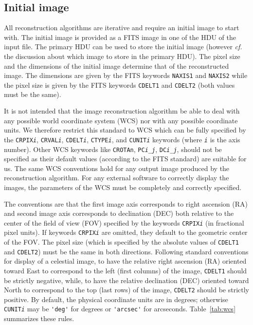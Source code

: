 \documentclass{article}
\newcommand{\KEYWORD}[1]{\texttt{#1}} %
\newcommand{\VARIABLE}[1]{\texttt{\textsl{#1}}}
\begin{document}
\subsection{Initial image}

All reconstruction algorithms are iterative and require an initial
image to start with. The initial image is provided as a FITS image in
one of the HDU of the input file. The primary HDU can be used to store
the initial image (however \emph{cf.} the discussion about which image
to store in the primary HDU). The pixel size and the dimensions of the
initial image determine that of the reconstructed image.  The
dimensions are given by the FITS keywords \KEYWORD{NAXIS1} and
\KEYWORD{NAXIS2} while the pixel size is given by the FITS keywords
\KEYWORD{CDELT1} and \KEYWORD{CDELT2} (both values must be the same).

It is not intended that the image reconstruction algorithm be able to deal
with any possible world coordinate system (WCS) nor with any possible
coordinate units.  We therefore restrict this standard to WCS which can be
fully specified by the \KEYWORD{CRPIX\VARIABLE{i}},
\KEYWORD{CRVAL\VARIABLE{i}}, \KEYWORD{CDELT\VARIABLE{i}},
\KEYWORD{CTYPE\VARIABLE{i}}, and \KEYWORD{CUNIT\VARIABLE{i}} keywords
(where \VARIABLE{i} is the axis number). Other WCS keywords like
\KEYWORD{CROTAn}, \KEYWORD{PC\VARIABLE{i}\_\VARIABLE{j}},
\KEYWORD{DC\VARIABLE{i}\_\VARIABLE{j}}, should not be specified as their
default values (according to the FITS standard) are suitable for us.  The
same WCS conventions hold for any output image produced by the
reconstruction algorithm.  For any external software to correctly display
the images, the parameters of the WCS must be completely and correctly
specified.

The conventions are that the first image axis corresponds to right
ascension (RA) and second image axis corresponds to declination (DEC) both
relative to the center of the field of view (FOV) specified by the keywords
\KEYWORD{CRPIX\VARIABLE{i}} (in fractional pixel units). If keywords
\KEYWORD{CRPIX\VARIABLE{i}} are omitted, they default to the geometric
center of the FOV. The pixel size (which is specified by the absolute
values of \KEYWORD{CDELT1} and \KEYWORD{CDELT2}) must be the same in both
directions.  Following standard conventions for display of a celestial
image, to have the relative right ascension (RA) oriented toward East to
correspond to the left (first columns) of the image, \KEYWORD{CDELT1}
should be strictly negative, while, to have the relative declination (DEC)
oriented toward North to correspond to the top (last rows) of the image,
\KEYWORD{CDELT2} should be strictly positive. By default, the physical
coordinate units are in degrees; otherwise \KEYWORD{CUNIT\VARIABLE{i}} may
be \verb+'deg'+ for degrees or \verb+'arcsec'+ for arcseconds.
Table~\ref{tab:wcs} summarizes these rules.
\end{document}
